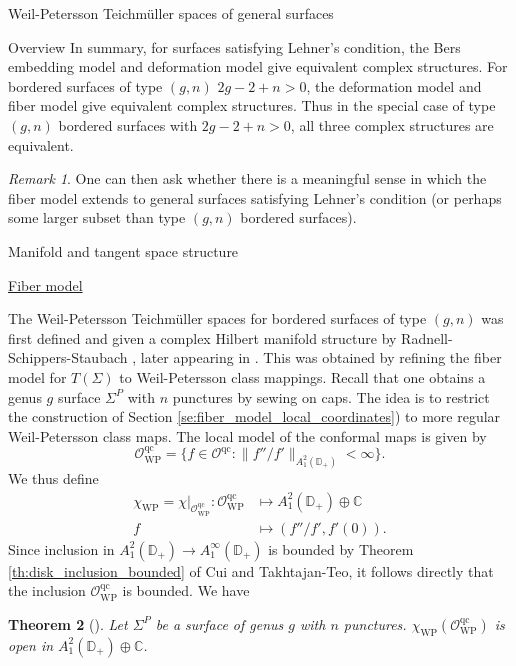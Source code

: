 \documentclass[12pt]{amsart}
\newcommand{\disk}{\ensuremath{\mathbb{D}} } %
\newcommand{\riem}{\Sigma}  %
\theoremstyle{plain}
\newtheorem{theorem}{Theorem}[section]
\theoremstyle{definition}
\theoremstyle{remark}
\newtheorem{remark}[theorem]{Remark}
\numberwithin{equation}{section} %
\numberwithin{figure}{section} %
\begin{document}
\begin{section}{Weil-Petersson Teichm\"uller spaces of general surfaces}
\begin{subsection}{Overview}
 In summary, for surfaces satisfying Lehner's condition, the Bers embedding model and deformation model give equivalent complex structures. For bordered surfaces of type $(g,n)$ $2g-2+n>0$, the deformation model and fiber model give equivalent complex structures.
 Thus in the special case of type $(g,n)$ bordered surfaces with $2g-2+n>0$, all three complex structures are equivalent. 
 \begin{remark}
 One can then ask whether there is a meaningful sense in which the fiber model extends to general surfaces satisfying Lehner's condition (or perhaps some larger subset than type $(g,n)$ bordered surfaces). 
 \end{remark}
\end{subsection}
\begin{subsection}{Manifold and tangent space structure}
\begin{subsubsection}{{\underline{Fiber model}}}

The Weil-Petersson Teichm\"uller spaces for bordered surfaces of type $(g,n)$ was first defined and given a complex Hilbert manifold structure by Radnell- Schippers-Staubach \cite{RSS_Filbert_arxiv}, later appearing in \cite{RSS_Filbert1,RSS_Filbert2}. This was obtained by refining the fiber model for $T(\riem)$ to Weil-Petersson class mappings. Recall that one obtains a genus $g$ surface $\riem^P$ with $n$ punctures by sewing on caps. The idea is to restrict the construction of Section \ref{se:fiber_model_local_coordinates}) to more regular Weil-Petersson class maps. 
The local model of the conformal maps is given by 
\[ \mathcal{O}^{\mathrm{qc}}_{\mathrm{WP}} = \{ f \in \mathcal{O}^{\mathrm{qc}} : \| f''/f' \|_{A_1^2(\disk_+)} < \infty  \}.     \]
We thus define 
\begin{align*}
    \chi_{\mathrm{WP}} = \left. \chi \right|_{\mathcal{O}^{\mathrm{qc}}_{\mathrm{WP}}}:  \mathcal{O}^{\mathrm{qc}}_{\mathrm{WP}} & \mapsto A_1^2(\disk_+) \oplus \mathbb{C} \\
    f & \mapsto \left( f''/f',f'(0) \right).
\end{align*}
Since inclusion in $A_1^2(\disk_+) \rightarrow A_1^\infty(\disk_+)$ is bounded by Theorem \ref{th:disk_inclusion_bounded} of Cui and Takhtajan-Teo, it follows directly that the inclusion $\mathcal{O}_{\mathrm{WP}}^{\mathrm{qc}}$ is bounded.   
We have
\begin{theorem}[\cite{RSS_Filbert1}]
 Let $\riem^P$ be a surface of genus $g$ with $n$ punctures.
  $\chi_{\mathrm{WP}}(\mathcal{O}^{\mathrm{qc}}_{\mathrm{WP}})$ is open in $A_1^2(\disk_+) \oplus \mathbb{C}$.  
\end{theorem}


\end{subsubsection}
\end{subsection}
\end{section}
\end{document}
